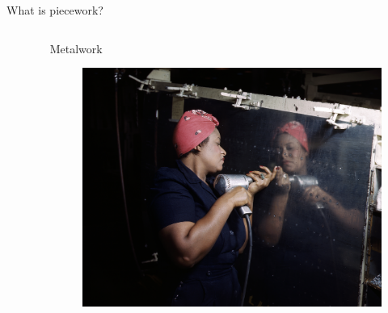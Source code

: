 \documentclass[presentation]{subfiles}
\begin{document}
\begin{frame}[t]{What is piecework?}
\begin{columns}
\begin{column}{0.33\textwidth}
\begin{figure}
\begin{overlayarea}{\textwidth}{33mm}
\begin{minipage}[c][33mm]{\textwidth}
    \end{minipage}
    \end{overlayarea}
    \end{figure}
  \end{column}
  \begin{column}{0.33\textwidth}
    \centering
    Metalwork
    \begin{figure}
    \begin{overlayarea}{\textwidth}{33mm}
    \begin{minipage}[c][33mm]{\textwidth}
      \includegraphics[width=\textwidth]{figures/photo/Rosie_the_Riveter_(Vultee)_DS.jpg}
    \end{minipage}
    \end{overlayarea}
    \end{figure}
  \end{column}
\end{columns}


\end{frame}
\end{document}
